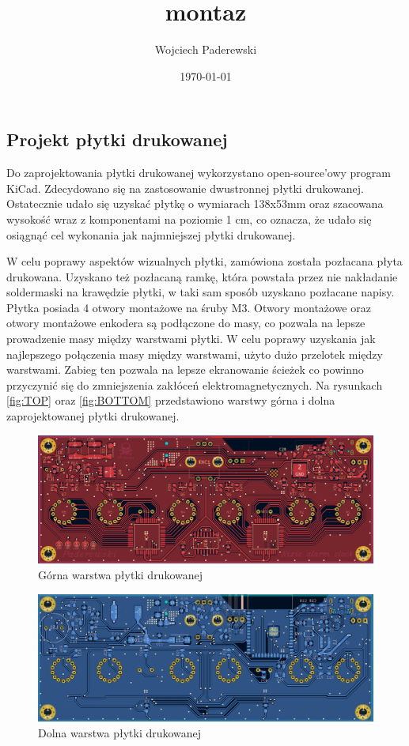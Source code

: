\documentclass[../main.tex]{subfiles}
\author{Wojciech Paderewski}
\date{\today}
\title{montaz}
\begin{document}
\subsection{Projekt płytki drukowanej}
Do zaprojektowania płytki drukowanej wykorzystano open-source'owy program KiCad. Zdecydowano się na zastosowanie dwustronnej płytki drukowanej.
Ostatecznie udało się uzyskać płytkę o wymiarach 138x53mm oraz szacowana wysokość wraz z komponentami na poziomie 1 cm, 
co oznacza, że udało się osiągnąć cel wykonania jak najmniejszej płytki drukowanej.

W celu poprawy aspektów wizualnych płytki, zamówiona została pozłacana płyta drukowana. Uzyskano też pozłacaną ramkę, która powstała przez 
nie nakładanie soldermaski na krawędzie płytki, w taki sam sposób uzyskano pozłacane napisy. Płytka posiada 4 otwory montażowe na śruby M3.
Otwory montażowe oraz otwory montażowe enkodera są podłączone do masy, co pozwala na lepsze prowadzenie masy między warstwami płytki. W 
celu poprawy uzyskania jak najlepszego połączenia masy między warstwami, użyto dużo przelotek między warstwami. Zabieg ten pozwala na
lepsze ekranowanie ścieżek co powinno przyczynić się do zmniejszenia zakłóceń elektromagnetycznych. Na rysunkach \ref{fig:TOP} oraz \ref{fig:BOTTOM}
przedstawiono warstwy górna i dolna zaprojektowanej płytki drukowanej.

\begin{figure}[H]
    \centering
    \includegraphics[width=1\textwidth]{TOP.png}
    \caption{Górna warstwa płytki drukowanej}
\end{figure}

\begin{figure}[H]
    \centering
    \includegraphics[width=1\textwidth]{BOTTOM.png}
    \caption{Dolna warstwa płytki drukowanej}
\end{figure}
\end{document}
